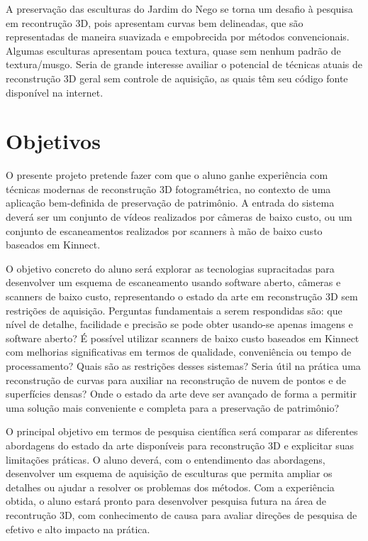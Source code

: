 A preservação das esculturas do Jardim do Nego se torna um desafio à pesquisa em
recontrução 3D, pois apresentam curvas bem delineadas, que são 
representadas de maneira suavizada e empobrecida por métodos convencionais.
Algumas esculturas apresentam pouca textura, quase sem nenhum padrão de textura/musgo.
Seria de grande interesse availiar o potencial de técnicas atuais de
reconstrução 3D geral sem controle de aquisição, as quais têm seu código fonte
disponível na internet.

\section{Objetivos}

O presente projeto pretende fazer com que o aluno ganhe experiência com técnicas
modernas de reconstrução 3D fotogramétrica, no contexto de uma aplicação
bem-definida de preservação de patrimônio. A entrada do sistema deverá ser um
conjunto de vídeos realizados por câmeras de baixo custo, ou um conjunto de
escaneamentos realizados por scanners à mão de baixo custo baseados em Kinnect.

O objetivo concreto do aluno será explorar as tecnologias supracitadas para
desenvolver um esquema de escaneamento usando software aberto, câmeras e
scanners de baixo custo, representando o estado da arte em reconstrução 3D sem
restrições de aquisição. Perguntas fundamentais a serem respondidas são: que
nível de detalhe, facilidade e precisão se pode obter usando-se apenas imagens e software
aberto? É possível utilizar scanners de baixo custo baseados em Kinnect com
melhorias significativas em termos de qualidade, conveniência ou tempo de
processamento?  Quais são as restrições desses sistemas? Seria útil na prática
uma reconstrução de curvas para auxiliar na reconstrução de nuvem de pontos e de
superfícies densas? Onde o estado da arte deve ser avançado de forma a permitir
uma solução mais conveniente e completa para a preservação de patrimônio?

O principal objetivo em termos de pesquisa científica será comparar as
diferentes abordagens do estado da arte disponíveis para reconstrução 3D e
explicitar suas limitações práticas. O aluno deverá, com o entendimento das
abordagens, desenvolver um esquema de aquisição de esculturas que permita
ampliar os detalhes ou ajudar a resolver os problemas dos métodos. Com a
experiência obtida, o aluno estará pronto para desenvolver pesquisa futura na
área de recontrução 3D, com conhecimento de causa para avaliar direções de
pesquisa de efetivo e alto impacto na prática.




